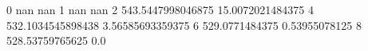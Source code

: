 0 nan nan
1 nan nan
2 543.5447998046875 15.0072021484375
4 532.1034545898438 3.56585693359375
6 529.0771484375 0.53955078125
8 528.53759765625 0.0
